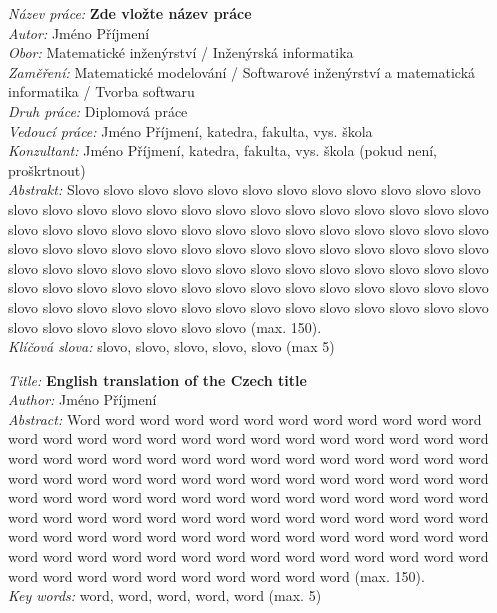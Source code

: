 \documentclass[11pt,a4paper,oneside]{book}
\begin{document}
{
\setlength{\parindent}{0pt}

\textit{Název práce:}
\textbf{Zde vložte název práce} \\

\textit{Autor:} Jméno Příjmení \\

\textit{Obor:} Matematické inženýrství / Inženýrská informatika \\

\textit{Zaměření:} Matematické modelování / Softwarové inženýrství a matematická informatika / Tvorba softwaru \\

\textit{Druh práce:} Diplomová práce \\

\textit{Vedoucí práce:}  Jméno Příjmení, katedra, fakulta, vys. škola \\

\textit{Konzultant:}  Jméno Příjmení, katedra, fakulta, vys. škola (pokud není, proškrtnout) \\

\textit{Abstrakt:} 
Slovo slovo slovo slovo slovo slovo slovo slovo slovo slovo slovo slovo slovo slovo
slovo slovo slovo slovo slovo slovo slovo slovo slovo slovo slovo slovo slovo slovo
slovo slovo slovo slovo slovo slovo slovo slovo slovo slovo slovo slovo slovo slovo
slovo slovo slovo slovo slovo slovo slovo slovo slovo slovo slovo slovo slovo slovo
slovo slovo slovo slovo slovo slovo slovo slovo slovo slovo slovo slovo slovo slovo
slovo slovo slovo slovo slovo slovo slovo slovo slovo slovo slovo slovo slovo slovo
slovo slovo slovo slovo slovo slovo slovo slovo slovo slovo slovo slovo slovo slovo
slovo slovo slovo slovo slovo (max. 150).\\

\textit{Klíčová slova:}  slovo, slovo, slovo, slovo, slovo (max 5)

\vspace{1.5cm}

\textit{Title:}
\textbf{English translation of the Czech title} \\

\textit{Author:} Jméno Příjmení\\

\textit{Abstract:} 
Word word word word word word word word word word word word
word word word word word word word word word word word word
word word word word word word word word word word word word
word word word word word word word word word word word word
word word word word word word word word word word word word
word word word word word word word word word word word word
word word word word word word word word word word word word
word word word word word word word word word word word word
word word word word word word word word word word word word
word word word word word word word word word word word word
(max. 150). \\

\textit{Key words:}  word, word, word, word, word (max. 5)
}
\end{document}
